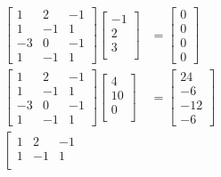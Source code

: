 \documentclass[12pt]{article}
\begin{document}
            \begin{align*}
                \left[\begin{matrix}
                    1 & 2 & -1\\
                    1 & -1 & 1\\
                    -3 & 0 & -1\\
                    1 & -1 & 1
                \end{matrix}\right]
                \left[\begin{matrix}
                    -1\\
                    2\\
                    3\\
                \end{matrix}\right] &=
                \left[\begin{matrix}
                    0\\
                    0\\
                    0\\
                    0
                \end{matrix}\right]\\
                \left[\begin{matrix}
                    1 & 2 & -1\\
                    1 & -1 & 1\\
                    -3 & 0 & -1\\
                    1 & -1 & 1
                \end{matrix}\right]
                \left[\begin{matrix}
                    4\\
                    10\\
                    0\\
                \end{matrix}\right] &=
                \left[\begin{matrix}
                    24\\
                    -6\\
                    -12\\
                    -6
                \end{matrix}\right]\\
                \left[\begin{matrix}
                    1 & 2 & -1\\
                    1 & -1 & 1\\

\end{matrix}
\end{align*}
\end{document}
